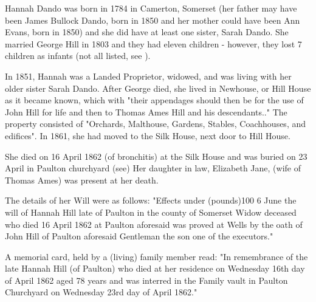 
   
Hannah Dando was born in 1784 in Camerton, Somerset (her father may have been James Bullock Dando, born in 1850 and her mother could have been Ann Evans, born in 1850) and she did have at least one sister, Sarah Dando.  She married George Hill in 1803 and they had eleven children - however, they lost 7 children as infants (not all listed, see ). 

In 1851, Hannah was a Landed Proprietor, widowed, and was living with her older sister Sarah Dando.\cite{HDandoHome} After George died, she lived in Newhouse, or Hill House as it became known, which with "their appendages should then be for the use of John Hill for life and then to Thomas Ames Hill and his descendants.." The property consisted of "Orchards, Malthouse, Gardens, Stables, Coachhouses, and edifices". In 1861, she had moved to the Silk House, next door to Hill House.\cite{HDando1861}

She died on 16 April 1862 (of bronchitis) at the Silk House and was buried on 23 April in Paulton churchyard (see) Her daughter in law, Elizabeth Jane, (wife of Thomas Ames) was present at her death.  

The details of her Will were as follows: 
"Effects under (pounds)100 6 June the will of Hannah Hill late of Paulton in the county of Somerset Widow deceased who died 16 April 1862 at Paulton aforesaid was proved at Wells by the oath of John Hill of Paulton aforesaid Gentleman the son one of the executors."

A memorial card, held by a (living) family member read:
"In remembrance of the late Hannah Hill (of Paulton) who died at her residence on Wednesday 16th day of April 1862 aged 78 years and was interred in the Family vault in Paulton Churchyard on Wednesday 23rd day of April 1862." 
